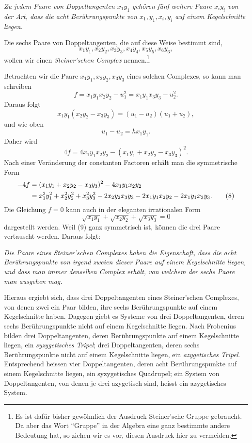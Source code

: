 \documentclass[11pt]{article}
\begin{document}
\emph{Zu jedem Paare von Doppeltangenten \(x_1y_1\) gehören fünf weitere Paare \(x_iy_i\) von der Art, dass die acht Berührungspunkte von \(x_1,y_1,x_i,y_i\) auf einem Kegelschnitte liegen.}

Die sechs Paare von Doppeltangenten, die auf diese Weise bestimmt sind,
\[
 x_1y_1,
 x_2y_2,
 x_3y_3,
 x_4y_4,
 x_5y_5,
 x_6y_6,
\]
wollen wir einen \emph{Steiner'schen Complex} nennen.\footnote{Es ist dafür bisher gewöhnlich der Ausdruck Steiner'sche Gruppe gebraucht. Da aber das Wort ``Gruppe'' in der Algebra eine ganz bestimmte andere Bedeutung hat, so ziehen wir es vor, diesen Ausdruck hier zu vermeiden.}

Betrachten wir die Paare \(x_1y_1,x_2y_2,x_3y_3\) eines solchen Complexes, so kann man schreiben
\[
 f=x_1y_1x_2y_2-u_1^2=x_1y_1x_3y_3-u_2^2.
\]
Daraus folgt
\[
 x_1y_1(x_2y_2-x_3y_3)=(u_1-u_2)(u_1+u_2),
\]
und wie oben
\[
 u_1-u_2=hx_1y_1.
\]
Daher wird
\begin{equation}
 4f=4x_1y_1x_2y_2-(x_1y_1+x_2y_2-x_3y_3)^2.
 \tag{7}
\end{equation}
Nach einer Veränderung der constanten Factoren erhält man die symmetrische Form
\begin{align}
 -4f&=(x_1y_1+x_2y_2-x_3y_3)^2-4x_1y_1x_2y_2\notag\\
 &=x_1^2y_1^2+x_2^2y_2^2+x_3^2y_3^2
 -2x_2y_2x_3y_3-2x_1y_1x_2y_2-2x_1y_1x_3y_3.
 \tag{8}
\end{align}
Die Gleichung \(f=0\) kann auch in der eleganten irrationalen Form
\begin{equation}
 \sqrt{x_1y_1}+\sqrt{x_2y_2}+\sqrt{x_3y_3}=0
 \tag{9}
\end{equation}
dargestellt werden. Weil (9) ganz symmetrisch ist, können die drei Paare vertauscht werden. Daraus folgt:

\emph{Die Paare eines Steiner'schen Complexes haben die Eigenschaft, dass die acht Berührungspunkte von irgend zweien dieser Paare auf einem Kegelschnitte liegen, und dass man immer denselben Complex erhält, von welchem der sechs Paare man ausgehen mag.}

Hieraus ergiebt sich, dass drei Doppeltangenten eines Steiner'schen Complexes, von denen zwei ein Paar bilden, ihre sechs Berührungspunkte auf einem Kegelschnitte haben. Dagegen giebt es Systeme von drei Doppeltangenten, deren sechs Berührungspunkte nicht auf einem Kegelschnitte liegen. Nach Frobenius bilden drei Doppeltangenten, deren Berührungspunkte auf einem Kegelschnitte liegen, ein \emph{syzygetisches Tripel}; drei Doppeltangenten, deren sechs Berührungspunkte nicht auf einem Kegelschnitte liegen, ein \emph{azygetisches Tripel}. Entsprechend heissen vier Doppeltangenten, deren acht Berührungspunkte auf einem Kegelschnitte liegen, ein syzygetisches Quadrupel; ein System von Doppeltangenten, von denen je drei azygetisch sind, heisst ein azygetisches System.
\end{document}
